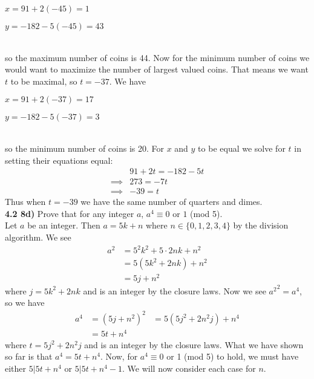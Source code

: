 \documentclass{scrartcl}
\begin{document}
\begin{minipage}{0.45\linewidth}
  $x = 91 + 2(-45) = 1$
\end{minipage}
\begin{minipage}{0.45\linewidth}
  $y = -182 - 5(-45) = 43$
\end{minipage}\\

so the maximum number of coins is 44. Now for the minimum number of coins we would want to maximize the number of largest valued coins. That means we want $t$ to be maximal, so $t=-37$. We have\\

\begin{minipage}{0.45\linewidth}
  $x = 91 + 2(-37) = 17$
\end{minipage}
\begin{minipage}{0.45\linewidth}
  $y = -182 - 5(-37) = 3$
\end{minipage}\\

so the minimum number of coins is 20. For $x$ and $y$ to be equal we solve for $t$ in setting their equations equal:
\begin{align*}
  &91 + 2t = -182 - 5t\\
  \implies&273 = -7t\\
  \implies&-39 = t
\end{align*}
Thus when $t = -39$ we have the same number of quarters and dimes.\\

\textbf{4.2 8d)} Prove that for any integer $a$, $a^4 \equiv 0$ or $1$ (mod 5).\\

Let $a$ be an integer. Then $a = 5k+n$ where $n\in\{0,1,2,3,4\}$ by the division algorithm. We see
\begin{align*}
  a^2 &= 5^2k^2 + 5\cdot2nk + n^2\\
  &= 5\left(5k^2+2nk\right) + n^2\\
  &= 5j+n^2
\end{align*}
where $j=5k^2+2nk$ and is an integer by the closure laws. Now we see ${a^2}^2=a^4$, so we have
\begin{align*}
  a^4 &= \left(5j+n^2\right)^2
  &= 5\left(5j^2+2n^2j\right) + n^4\\
  &= 5t + n^4
\end{align*}
where $t=5j^2+2n^2j$ and is an integer by the closure laws. What we have shown so far is that $a^4 = 5t + n^4$. Now, for $a^4 \equiv 0$ or 1 (mod 5) to hold, we must have either $5 | 5t + n^4$ or $5 | 5t + n^4 - 1$. We will now consider each case for $n$.\\
\end{document}
